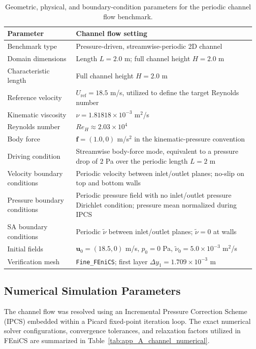 \begin{table}[htbp]
	\centering
	\footnotesize
	\caption{Geometric, physical, and boundary-condition parameters for the periodic channel flow benchmark.}
	\label{tab:app_A_channel_physical}
	\renewcommand{\arraystretch}{1.2}
	\begin{tabularx}{\textwidth}{l X}
		\hline
		\textbf{Parameter} & \textbf{Channel flow setting} \\
		\hline
		Benchmark type & Pressure-driven, streamwise-periodic 2D channel \\
		Domain dimensions & Length $L=2.0$ m; full channel height $H=2.0$ m \\
		Characteristic length & Full channel height $H=2.0$ m \\
		Reference velocity & $U_{\mathrm{ref}}=18.5$ m/s, utilized to define the target Reynolds number \\
		Kinematic viscosity & $\nu = 1.81818 \times 10^{-3}$ m$^2$/s \\
		Reynolds number & $Re_H \approx 2.03 \times 10^4$ \\
			Body force & $\mathbf{f}=(1.0,0)$ m/s$^2$ in the kinematic-pressure convention \\
			Driving condition & Streamwise body-force mode, equivalent to a pressure drop of $2$ Pa over the periodic length $L=2$ m \\
			Velocity boundary conditions & Periodic velocity between inlet/outlet planes; no-slip on top and bottom walls \\
			Pressure boundary conditions & Periodic pressure field with no inlet/outlet pressure Dirichlet condition; pressure mean normalized during IPCS \\
			SA boundary conditions & Periodic $\tilde{\nu}$ between inlet/outlet planes; $\tilde{\nu}=0$ at walls \\
			Initial fields & $\mathbf{u}_0=(18.5,0)$ m/s, $p_0=0$ Pa, $\tilde{\nu}_0=5.0 \times 10^{-3}$ m$^2$/s \\
		Verification mesh & \texttt{Fine\_FEniCS}; first layer $\Delta y_1 = 1.709 \times 10^{-3}$ m \\
		\hline
	\end{tabularx}
\end{table}

\subsection{Numerical Simulation Parameters}
\label{subsec:app_A_channel_numerical}
The channel flow was resolved using an Incremental Pressure Correction Scheme (IPCS) embedded within a Picard fixed-point iteration loop. The exact numerical solver configurations, convergence tolerances, and relaxation factors utilized in FEniCS are summarized in Table~\ref{tab:app_A_channel_numerical}.

